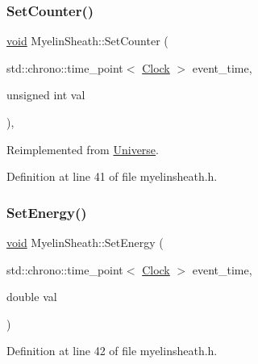 \subsubsection{\texorpdfstring{Set\+Counter()}{SetCounter()}}
{\footnotesize\ttfamily \mbox{\hyperlink{glad_8h_a950fc91edb4504f62f1c577bf4727c29}{void}} Myelin\+Sheath\+::\+Set\+Counter (\begin{DoxyParamCaption}\item[{std\+::chrono\+::time\+\_\+point$<$ \mbox{\hyperlink{universe_8h_a0ef8d951d1ca5ab3cfaf7ab4c7a6fd80}{Clock}} $>$}]{event\+\_\+time,  }\item[{unsigned int}]{val }\end{DoxyParamCaption})\hspace{0.3cm}{\ttfamily [inline]}, {\ttfamily [virtual]}}



Reimplemented from \mbox{\hyperlink{class_universe_aa22202ae740eb1355529afcb13285e91}{Universe}}.



Definition at line 41 of file myelinsheath.\+h.

\mbox{\label{class_myelin_sheath_ad0f6dbae2819f6642a92b8e85ec8f775}} 
\subsubsection{\texorpdfstring{Set\+Energy()}{SetEnergy()}}
{\footnotesize\ttfamily \mbox{\hyperlink{glad_8h_a950fc91edb4504f62f1c577bf4727c29}{void}} Myelin\+Sheath\+::\+Set\+Energy (\begin{DoxyParamCaption}\item[{std\+::chrono\+::time\+\_\+point$<$ \mbox{\hyperlink{universe_8h_a0ef8d951d1ca5ab3cfaf7ab4c7a6fd80}{Clock}} $>$}]{event\+\_\+time,  }\item[{double}]{val }\end{DoxyParamCaption})\hspace{0.3cm}{\ttfamily [inline]}}



Definition at line 42 of file myelinsheath.\+h.

\mbox{\label{class_myelin_sheath_af53c8f36ee963168dec09b74a6be8e4c}} 
